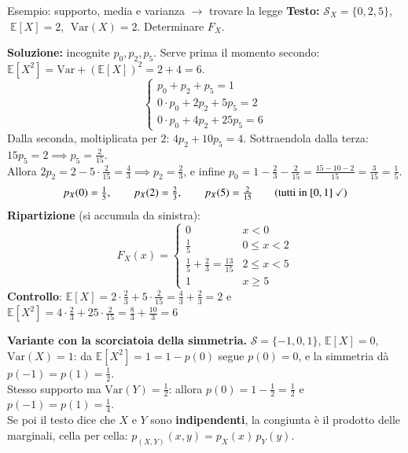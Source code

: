 \documentclass[12pt]{extarticle} %
\begin{document}
\begin{eserciziobox}{{Esempio: supporto, media e varianza $\to$ trovare la legge}}
\textbf{Testo:} $\mathcal{S}_X = \{0, 2, 5\}$, $\;\mathbb{E}[X] = 2$, $\;\mathrm{Var}(X) = 2$. Determinare $F_X$.
\par\textbf{Soluzione:} incognite $p_0, p_2, p_5$. Serve prima il momento secondo: $\mathbb{E}[X^2] = \mathrm{Var} + (\mathbb{E}[X])^2 = 2 + 4 = 6$.
$$ \begin{cases} p_0 + p_2 + p_5 = 1 \\ 0\cdot p_0 + 2 p_2 + 5 p_5 = 2 \\ 0 \cdot p_0 + 4 p_2 + 25 p_5 = 6 \end{cases} $$
Dalla seconda, moltiplicata per $2$: $4p_2 + 10 p_5 = 4$. Sottraendola dalla terza: $15 p_5 = 2 \implies p_5 = \frac{2}{15}$. \\
Allora $2p_2 = 2 - 5\cdot\frac{2}{15} = \frac43 \implies p_2 = \frac23$, e infine $p_0 = 1 - \frac23 - \frac{2}{15} = \frac{15 - 10 - 2}{15} = \frac{3}{15} = \frac15$.
$$ p_X(0) = \tfrac15, \qquad p_X(2) = \tfrac23, \qquad p_X(5) = \tfrac{2}{15} \qquad (\text{tutti in } [0,1] \text{ \checkmark}) $$
\textbf{Ripartizione} (si accumula da sinistra):
$$ F_X(x) = \begin{cases} 0 & x < 0 \\ \frac15 & 0 \le x < 2 \\ \frac15 + \frac23 = \frac{13}{15} & 2 \le x < 5 \\ 1 & x \ge 5 \end{cases} $$
{\footnotesize \textbf{Controllo}: $\mathbb{E}[X] = 2\cdot\frac23 + 5\cdot\frac{2}{15} = \frac43+\frac23 = 2$ \checkmark \; e \; $\mathbb{E}[X^2] = 4\cdot\frac23 + 25\cdot\frac{2}{15} = \frac83+\frac{10}{3} = 6$ \checkmark}
\end{eserciziobox}

{\footnotesize \textbf{Variante con la scorciatoia della simmetria.} $\mathcal{S} = \{-1,0,1\}$, $\mathbb{E}[X] = 0$, $\mathrm{Var}(X) = 1$: da $\mathbb{E}[X^2] = 1 = 1 - p(0)$ segue $p(0) = 0$, e la simmetria dà $p(-1) = p(1) = \frac12$. \\
Stesso supporto ma $\mathrm{Var}(Y) = \frac12$: allora $p(0) = 1 - \frac12 = \frac12$ e $p(-1) = p(1) = \frac14$. \\
Se poi il testo dice che $X$ e $Y$ sono \textbf{indipendenti}, la congiunta è il prodotto delle marginali, cella per cella: $p_{(X,Y)}(x,y) = p_X(x)\,p_Y(y)$.}

\newpage
\end{document}
